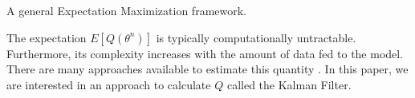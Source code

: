 \documentclass[mscthesis]{usiinfthesis}
\begin{document}
\begin{algorithm}[h]
  \label{em:cycle}
  \caption{A general Expectation Maximization framework.}
\end{algorithm}

The expectation $E[Q(\theta^n)]$ is typically computationally untractable. Furthermore, its complexity increases with the amount of data fed to the model. There are many approaches available to estimate this quantity \cite{book:EMBook}. In this paper, we are interested in an approach to calculate $Q$ called the Kalman Filter.

%
%


%
%
%
%


\end{document}
